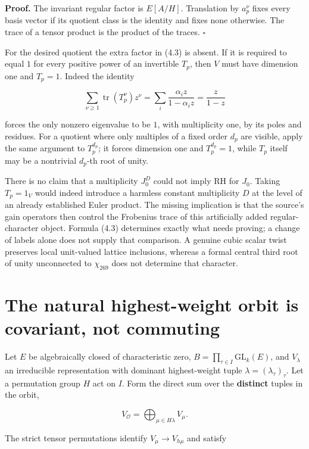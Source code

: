 \documentclass[11pt]{article}
\begin{document}
\textbf{Proof.} The invariant regular factor is \(E[A/H]\). Translation by \(a_p^\nu\) fixes every basis vector if its quotient class is the identity and fixes none otherwise. The trace of a tensor product is the product of the traces. \(\square\)

For the desired quotient the extra factor in (4.3) is absent. If it is required to equal \(1\) for every positive power of an invertible \(T_p\), then \(V\) must have dimension one and \(T_p=1\). Indeed the identity

\[
 \sum_{\nu\ge1}\operatorname{tr}(T_p^\nu)z^\nu
 =\sum_i\frac{\alpha_i z}{1-\alpha_i z}
 =\frac{z}{1-z}
\]

forces the only nonzero eigenvalue to be \(1\), with multiplicity one, by its poles and residues. For a quotient where only multiples of a fixed order \(d_p\) are visible, apply the same argument to \(T_p^{d_p}\); it forces dimension one and \(T_p^{d_p}=1\), while \(T_p\) itself may be a nontrivial \(d_p\)-th root of unity.

There is no claim that a multiplicity \(J_0^D\) could not imply RH for \(J_0\). Taking \(T_p=1_V\) would indeed introduce a harmless constant multiplicity \(D\) at the level of an already established Euler product. The missing implication is that the source's gain operators then control the Frobenius trace of this artificially added regular-character object. Formula (4.3) determines exactly what needs proving; a change of labels alone does not supply that comparison. A genuine cubic scalar twist preserves local unit-valued lattice inclusions, whereas a formal central third root of unity unconnected to \(\chi_{269}\) does not determine that character.

\section{The natural highest-weight orbit is covariant, not commuting}\label{the-natural-highest-weight-orbit-is-covariant-not-commuting}

Let \(E\) be algebraically closed of characteristic zero, \(B=\prod_{\tau\in I}\mathrm{GL}_k(E)\), and \(V_\lambda\) an irreducible representation with dominant highest-weight tuple \(\lambda=(\lambda_\tau)_\tau\). Let a permutation group \(H\) act on \(I\). Form the direct sum over the \textbf{distinct} tuples in the orbit,

\[
 V_{\mathcal O}=\bigoplus_{\mu\in H\lambda}V_\mu.
\]

The strict tensor permutations identify \(V_\mu\to V_{h\mu}\) and satisfy
\end{document}
